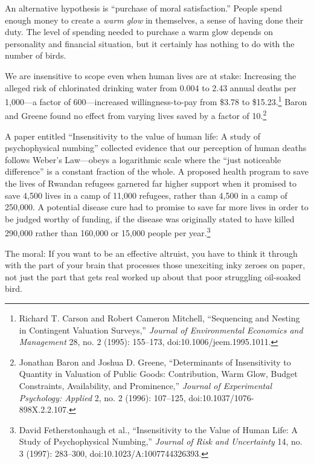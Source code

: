  An alternative hypothesis is ``purchase of moral
satisfaction.'' People spend enough money to create a
\textit{warm glow} in themselves, a sense of having done their duty.
The level of spending needed to purchase a warm glow depends on
personality and financial situation, but it certainly has nothing to do
with the number of birds.

{
 We are insensitive to scope even when human lives are at stake:
Increasing the alleged risk of chlorinated drinking water from 0.004 to
2.43 annual deaths per 1,000---a factor of 600---increased
willingness-to-pay from \$3.78 to \$15.23.\footnote{Richard T. Carson and Robert Cameron Mitchell,
``Sequencing and Nesting in Contingent Valuation
Surveys,'' \textit{Journal of Environmental Economics
and Management} 28, no. 2 (1995): 155--173,
doi:10.1006/jeem.1995.1011.} Baron and
Greene found no effect from varying lives saved by a factor of
10.\footnote{Jonathan Baron and Joshua D. Greene,
``Determinants of Insensitivity to Quantity in
Valuation of Public Goods: Contribution, Warm Glow, Budget Constraints,
Availability, and Prominence,'' \textit{Journal of
Experimental Psychology: Applied} 2, no. 2 (1996): 107--125,
doi:10.1037/1076-898X.2.2.107.}}

{
 A paper entitled ``Insensitivity to the value of
human life: A study of psychophysical numbing''
collected evidence that our perception of human deaths follows
Weber's Law---obeys a logarithmic scale where the
``just noticeable difference'' is a
constant fraction of the whole. A proposed health program to save the
lives of Rwandan refugees garnered far higher support when it promised
to save 4,500 lives in a camp of 11,000 refugees, rather than 4,500 in
a camp of 250,000. A potential disease cure had to promise to save far
more lives in order to be judged worthy of funding, if the disease was
originally stated to have killed 290,000 rather than 160,000 or 15,000
people per year.\footnote{David Fetherstonhaugh et al., ``Insensitivity
to the Value of Human Life: A Study of Psychophysical
Numbing,'' \textit{Journal of Risk and Uncertainty}
14, no. 3 (1997): 283--300, doi:10.1023/A:1007744326393.}}


 The moral: If you want to be an effective altruist, you have to
think it through with the part of your brain that processes those
unexciting inky zeroes on paper, not just the part that gets real
worked up about that poor struggling oil-soaked bird.

\myendsectiontext


